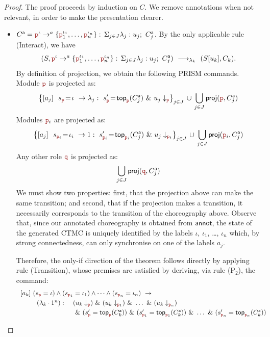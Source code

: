 \begin{proof}
  The proof proceeds by induction on $C$. We remove annotations when
  not relevant, in order to make the presentation clearer.
  \begin{itemize}

  \item
    $\anno
    C=\interactl{\nr^\iota}a{\nr_1^{\iota_1},\ldots,\nr_n^{\iota_n}}$. By
    the only applicable rule \textsf{(Interact)}, we have
    \[
      (S,
      \interactl{\nr^\iota}a{\nr_1^{\iota_1},\ldots,\nr_n^{\iota_n}})
      \red{\lambda_k} (S[u_k], C_k).
    \]
    By definition of projection, we obtain the following PRISM
    commands.  Module \(\nr\) is projected as:
    \[
      \left\{\commandBase {a_j} {\ s_{\nr}\!=\! \iota} {\lambda_j:}
      \ s_{\nr}'\!=\! \mathsf{top}_{\nr}(\anno{C}_j)\
      \&\ \projE {u_j}\nr\right\}_{j\in J}
      \,\cup\, \bigcup_{j\in J} \proj (\nr, \anno{C}_j)
    \]
    Modules \(\nr_i\) are projected as:
    \[
      \left\{\commandBase {a_j} {\ s_{\nr_i}\!=\! \iota_i} {1:\ s_{\nr_i}'\!=\!
      \mathsf{top}_{\nr_i}(\anno{C}_j)
      }
      \ \&\ \projE {u_j}{\nr_i}\right\}_{j\in J}
      \,\cup\, \bigcup_{j\in J} \proj (\nr_i, \anno{C}_j)
    \]
    Any other role $\nrr$ is projected as:
    \[
      \bigcup_{j\in J} \proj(\nrr, \anno C_j)
    \]
    We must show two properties: first, that the projection above can
    make the same transition; and second, that if the projection makes
    a transition, it necessarily corresponds to the transition of the
    choreography above.
    Observe that, since our annotated choreography is obtained from
    $\mathsf{annot}$, the state of the generated CTMC is uniquely
    identified by the labels $\iota$, $\iota_1$, \dots, $\iota_n$
    which, by strong connectedness, can only synchronise on one of the
    labels $a_j$.

    Therefore, the only-if direction of the theorem follows directly
    by applying rule \textsf{(Transition)}, whose premises are satisfied
    by deriving, via rule \textsf{(P$_2$)}, the command:
    \[
      \begin{array}{l}
        \commandBase{a_k}{(s_{\nr}=\iota) \land (s_{\nr_1}=\iota_1)
        \land \dots \land (s_{\nr_n}=\iota_n)}\\[1mm]
        \qquad
        \begin{array}{ll}
          (\lambda_k \cdot 1^n):\ &
                                    (\projE{u_k}{\nr})\ \&\
                                    (\projE{u_k}{\nr_1})\ \&\
                                    \dots\ \&\
                                    (\projE{u_k}{\nr_n})
          \\[1mm]
                                  &\ \&\
                                    (s_{\nr}'=\topannotation{\nr}{\anno C_k})\ \&\
                                    (s_{\nr_1}'=\topannotation{\nr_1}{\anno C_k})\ \&\
                                    \dots\ \&\
                                    (s_{\nr_n}'=\topannotation{\nr_n}{\anno C_k})
        \end{array}
      \end{array}
    \]


\end{itemize}
\end{proof}
